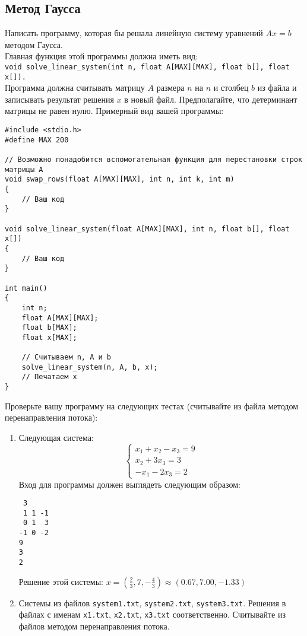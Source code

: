 \documentclass{article}
\begin{document}
\subsection{Метод Гаусса}
Написать программу, которая бы решала линейную систему уравнений $Ax = b$ методом Гаусса. \\
Главная функция этой программы должна иметь вид: \\ \texttt{void solve\_linear\_system(int n, float A[MAX][MAX], float b[], float x[]).} \\
Программа должна считывать матрицу $A$ размера $n$ на $n$ и столбец $b$ из файла и записывать результат решения $x$ в новый файл. Предполагайте, что детерминант матрицы не равен нулю. Примерный вид вашей программы:
\begin{lstlisting}
#include <stdio.h>
#define MAX 200

// Возможно понадобится вспомогательная функция для перестановки строк матрицы A
void swap_rows(float A[MAX][MAX], int n, int k, int m)
{
    // Ваш код
}

void solve_linear_system(float A[MAX][MAX], int n, float b[], float x[])
{
    // Ваш код
}

int main()
{
    int n;
    float A[MAX][MAX];
    float b[MAX];
    float x[MAX];
    
    // Считываем n, A и b
    solve_linear_system(n, A, b, x);
    // Печатаем x
}
\end{lstlisting}
Проверьте вашу программу на следующих тестах (считывайте из файла методом перенаправления потока): \\
\begin{enumerate}
\item Следующая система:
$$
\begin{cases} 
x_1 + x_2 - x_3 = 9 \\ 
x_2 + 3x_3 = 3 \\ 
-x_1 - 2x_3 = 2 
\end{cases}
$$
Вход для программы должен выглядеть следующим образом:
\begin{lstlisting}
 3
 1 1 -1
 0 1  3
-1 0 -2
9
3
2
\end{lstlisting}
Решение этой системы: $x = \left(\frac{2}{3}, 7, -\frac{4}{3}\right) \approx (0.67, 7.00, -1.33)$
\item Системы из файлов \texttt{system1.txt}, \texttt{system2.txt}, \texttt{system3.txt}. Решения в файлах с именам \texttt{x1.txt}, \texttt{x2.txt}, \texttt{x3.txt} соответственно. Считывайте из файлов методом перенаправления потока.
\end{enumerate}
\end{document}
